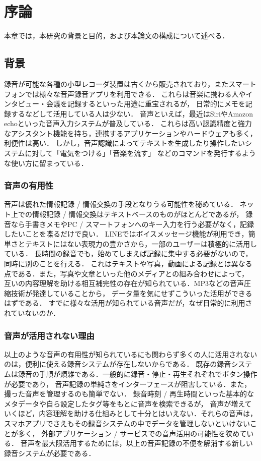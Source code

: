 \chapter{序論}
\label{chap:introduction}

本章では，本研究の背景と目的，および本論文の構成について述べる．

\newpage

\section{背景}

録音が可能な各種の小型レコーダ装置は古くから販売されており，またスマートフォンでは様々な音声録音アプリを利用できる．
これらは音楽に携わる人やインタビュー・会議を記録するといった用途に重宝されるが，
日常的にメモを記録するなどして活用している人は少ない．
音声といえば，最近はSiriやAmazon echoといった音声入力システムが普及している．
これらは高い認識精度と強力なアシスタント機能を持ち，連携するアプリケーションやハードウェアも多く，利便性は高い．
しかし，音声認識によってテキストを生成したり操作したいシステムに対して「電気をつける」「音楽を流す」
などのコマンドを発行するような使い方に留まっている．

\subsection{音声の有用性}

音声は優れた情報記録 / 情報交換の手段となりうる可能性を秘めている．
ネット上での情報記録 / 情報交換はテキストベースのものがほとんどであるが，
録音なら手書きメモやPC / スマートフォンへのキー入力を行う必要がなく，記録したいことを喋るだけで良い．
LINEではボイスメッセージ機能が利用でき，簡単さとテキストにはない表現力の豊かさから，一部のユーザーは積極的に活用している．
長時間の録音でも，始めてしまえば記録に集中する必要がないので，同時に別のことを行える．
これはテキストや写真，動画による記録とは異なる点である．また，写真や文章といった他のメディアとの組み合わせによって，
互いの内容理解を助ける相互補完性の存在が知られている\cite{Nakakura}．MP3などの音声圧縮技術が発達していることから，
データ量を気にせずこういった活用ができるはずである．
すでに様々な活用が知られている音声だが，なぜ日常的に利用されていないのか．

\subsection{音声が活用されない理由}

以上のような音声の有用性が知られているにも関わらず多くの人に活用されないのは，便利に使える録音システムが存在しないからである．
既存の録音システムは録音の手順が煩雑である．一般的に録音・停止・再生それぞれでボタン操作が必要であり，
音声記録の単純さをインターフェースが阻害している．また，撮った音声を管理するのも簡単でない．
録音時刻 / 再生時間といった基本的なメタデータや自ら設定したタグ等をもとに音声を検索できるが，
音声が増えていくほど，内容理解を助ける仕組みとして十分とはいえない．それらの音声は，
スマホアプリでさえもその録音システムの中でデータを管理しないといけないことが多く，
外部アプリケーション / サービスでの音声活用の可能性を狭めている．
音声を最大限活用するためには，以上の音声記録の不便を解消する新しい録音システムが必要である．

